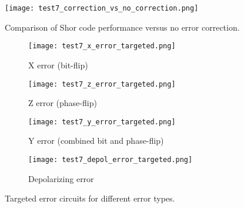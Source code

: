 \documentclass[12pt,a4paper]{article}
\begin{document}
\begin{figure}[H]
    \centering
    \texttt{[image: test7\_correction\_vs\_no\_correction.png]}
    \caption{Comparison of Shor code performance versus no error correction.}
    \label{fig:correction_vs_no_correction}
\end{figure}

\begin{figure}[H]
    \centering
    \begin{subfigure}[b]{0.49\textwidth}
        \texttt{[image: test7\_x\_error\_targeted.png]}
        \caption{X error (bit-flip)}
    \end{subfigure}
    \hfill
    \begin{subfigure}[b]{0.49\textwidth}
        \texttt{[image: test7\_z\_error\_targeted.png]}
        \caption{Z error (phase-flip)}
    \end{subfigure}
    
    \begin{subfigure}[b]{0.49\textwidth}
        \texttt{[image: test7\_y\_error\_targeted.png]}
        \caption{Y error (combined bit and phase-flip)}
    \end{subfigure}
    \hfill
    \begin{subfigure}[b]{0.49\textwidth}
        \texttt{[image: test7\_depol\_error\_targeted.png]}
        \caption{Depolarizing error}
    \end{subfigure}
    \caption{Targeted error circuits for different error types.}
    \label{fig:targeted_errors}
\end{figure}
\end{document}
